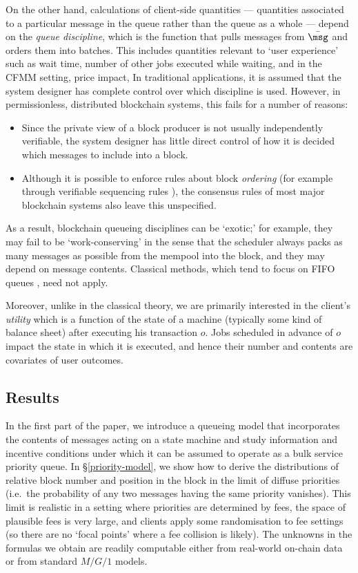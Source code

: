 \documentclass[a4paper,11pt]{article}
\begin{document}
On the other hand, calculations of client-side quantities --- quantities associated to a particular message in the queue rather than the queue as a whole --- depend on the \emph{queue discipline}, which is the function that pulls messages from $\bar\msg$ and orders them into batches.
%
This includes quantities relevant to `user experience' such as wait time, number of other jobs executed while waiting, and in the CFMM setting, price impact,
%
In traditional applications, it is assumed that the system designer has complete control over which discipline is used.
%
However, in permissionless, distributed blockchain systems, this fails for a number of reasons:
\begin{itemize}
  \item 
    Since the private view of a block producer is not usually independently verifiable, the system designer has little direct control of how it is decided which messages to include into a block.
  \item 
    Although it is possible to enforce rules about block \emph{ordering} (for example through verifiable sequencing rules \cite{ferreira2022credible}), the consensus rules of most major blockchain systems also leave this unspecified.
\end{itemize}
%
As a result, blockchain queueing disciplines can be `exotic;' for example, they may fail to be `work-conserving' in the sense that the scheduler always packs as many messages as possible from the mempool into the block, and they may depend on message contents.
%
Classical methods, which tend to focus on FIFO queues \cite{downton1955waiting}, need not apply.

Moreover, unlike in the classical theory, we are primarily interested in the client's \emph{utility} which is a function of the state of a machine (typically some kind of balance sheet) after executing his transaction $o$. 
%
Jobs scheduled in advance of $o$ impact the state in which it is executed, and hence their number and contents are covariates of user outcomes.


\subsection{Results}

In the first part of the paper, we introduce a queueing model that incorporates the contents of messages acting on a state machine and study information and incentive conditions under which it can be assumed to operate as a bulk service priority queue.
%
In \S\ref{priority-model}, we show how to derive the distributions of relative block number and position in the block in the limit of diffuse priorities (i.e.~the probability of any two messages having the same priority vanishes).
%
This limit is realistic in a setting where priorities are determined by fees, the space of plausible fees is very large, and clients apply some randomisation to fee settings (so there are no `focal points' where a fee collision is likely).
%
The unknowns in the formulas we obtain are readily computable either from real-world on-chain data or from standard $M/G/1$ models.
\end{document}
